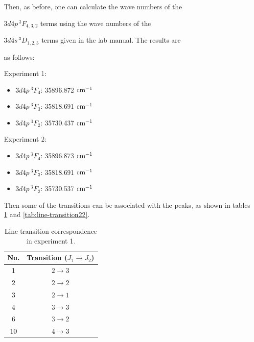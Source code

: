 \documentclass[a4paper]{article}
\begin{document}
Then, as before, one can calculate the wave numbers of the

$3d4p\,^3F_{4,3,2}$ terms using the wave numbers of the

$3d4s\,^3D_{1,2,3}$ terms given in the lab manual. The results are

as follows:

Experiment 1:

\begin{itemize}

\item $3d4p\,^3F_{4}$: 35896.872 $\rm cm^{-1}$

\item $3d4p\,^3F_{3}$: 35818.691 $\rm cm^{-1}$

\item $3d4p\,^3F_{2}$: 35730.437 $\rm cm^{-1}$

\end{itemize}

Experiment 2:

\begin{itemize}

\item $3d4p\,^3F_{4}$: 35896.873 $\rm cm^{-1}$

\item $3d4p\,^3F_{3}$: 35818.691 $\rm cm^{-1}$

\item $3d4p\,^3F_{2}$: 35730.537 $\rm cm^{-1}$

\end{itemize}

Then some of the transitions can be associated with the peaks, as shown in tables \ref{tab:line-transition21} and \ref{tab:line-transition22}.

\begin{table}[htb!]

\centering

\begin{tabular}{c|c}

\hline

No. & Transition ($J_1 \to J_2$)\\

\hline

1 & $2 \to 3$ \\

2 & $2 \to 2$ \\

3 & $2 \to 1$ \\

4 & $3 \to 3$ \\

6 & $3 \to 2$ \\

10 & $4 \to 3$\\

\hline

\end{tabular}

\caption{Line-transition correspondence in experiment 1.}

\label{tab:line-transition21}

\end{table}
\end{document}
